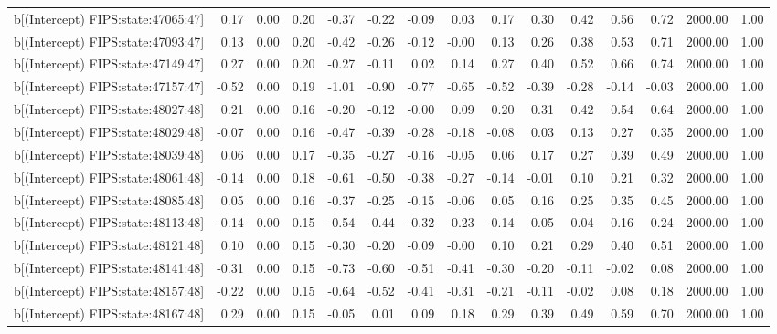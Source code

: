 \begin{table}[ht]
\begin{tabular}{rrrrrrrrrrrrrrr}
  b[(Intercept) FIPS:state:47065:47] & 0.17 & 0.00 & 0.20 & -0.37 & -0.22 & -0.09 & 0.03 & 0.17 & 0.30 & 0.42 & 0.56 & 0.72 & 2000.00 & 1.00 \\ 
  b[(Intercept) FIPS:state:47093:47] & 0.13 & 0.00 & 0.20 & -0.42 & -0.26 & -0.12 & -0.00 & 0.13 & 0.26 & 0.38 & 0.53 & 0.71 & 2000.00 & 1.00 \\ 
  b[(Intercept) FIPS:state:47149:47] & 0.27 & 0.00 & 0.20 & -0.27 & -0.11 & 0.02 & 0.14 & 0.27 & 0.40 & 0.52 & 0.66 & 0.74 & 2000.00 & 1.00 \\ 
  b[(Intercept) FIPS:state:47157:47] & -0.52 & 0.00 & 0.19 & -1.01 & -0.90 & -0.77 & -0.65 & -0.52 & -0.39 & -0.28 & -0.14 & -0.03 & 2000.00 & 1.00 \\ 
  b[(Intercept) FIPS:state:48027:48] & 0.21 & 0.00 & 0.16 & -0.20 & -0.12 & -0.00 & 0.09 & 0.20 & 0.31 & 0.42 & 0.54 & 0.64 & 2000.00 & 1.00 \\ 
  b[(Intercept) FIPS:state:48029:48] & -0.07 & 0.00 & 0.16 & -0.47 & -0.39 & -0.28 & -0.18 & -0.08 & 0.03 & 0.13 & 0.27 & 0.35 & 2000.00 & 1.00 \\ 
  b[(Intercept) FIPS:state:48039:48] & 0.06 & 0.00 & 0.17 & -0.35 & -0.27 & -0.16 & -0.05 & 0.06 & 0.17 & 0.27 & 0.39 & 0.49 & 2000.00 & 1.00 \\ 
  b[(Intercept) FIPS:state:48061:48] & -0.14 & 0.00 & 0.18 & -0.61 & -0.50 & -0.38 & -0.27 & -0.14 & -0.01 & 0.10 & 0.21 & 0.32 & 2000.00 & 1.00 \\ 
  b[(Intercept) FIPS:state:48085:48] & 0.05 & 0.00 & 0.16 & -0.37 & -0.25 & -0.15 & -0.06 & 0.05 & 0.16 & 0.25 & 0.35 & 0.45 & 2000.00 & 1.00 \\ 
  b[(Intercept) FIPS:state:48113:48] & -0.14 & 0.00 & 0.15 & -0.54 & -0.44 & -0.32 & -0.23 & -0.14 & -0.05 & 0.04 & 0.16 & 0.24 & 2000.00 & 1.00 \\ 
  b[(Intercept) FIPS:state:48121:48] & 0.10 & 0.00 & 0.15 & -0.30 & -0.20 & -0.09 & -0.00 & 0.10 & 0.21 & 0.29 & 0.40 & 0.51 & 2000.00 & 1.00 \\ 
  b[(Intercept) FIPS:state:48141:48] & -0.31 & 0.00 & 0.15 & -0.73 & -0.60 & -0.51 & -0.41 & -0.30 & -0.20 & -0.11 & -0.02 & 0.08 & 2000.00 & 1.00 \\ 
  b[(Intercept) FIPS:state:48157:48] & -0.22 & 0.00 & 0.15 & -0.64 & -0.52 & -0.41 & -0.31 & -0.21 & -0.11 & -0.02 & 0.08 & 0.18 & 2000.00 & 1.00 \\ 
  b[(Intercept) FIPS:state:48167:48] & 0.29 & 0.00 & 0.15 & -0.05 & 0.01 & 0.09 & 0.18 & 0.29 & 0.39 & 0.49 & 0.59 & 0.70 & 2000.00 & 1.00 \\ 

\end{tabular}
\end{table}
